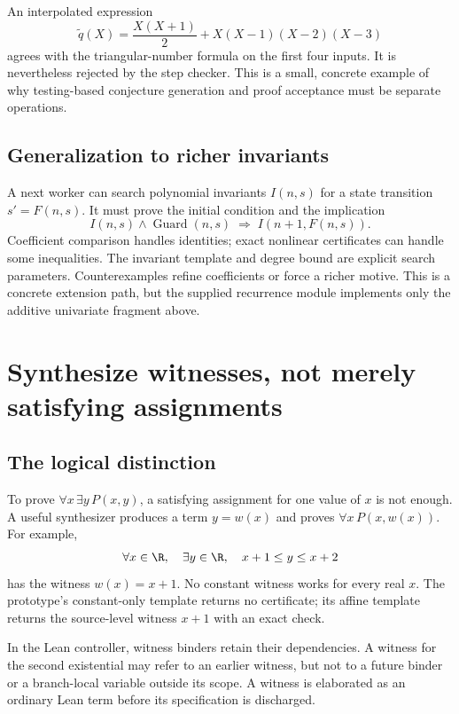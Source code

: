 An interpolated expression
\[
\widetilde q(X)=\frac{X(X+1)}2+X(X-1)(X-2)(X-3)
\]
agrees with the triangular-number formula on the first four inputs. It is
nevertheless rejected by the step checker. This is a small, concrete example
of why testing-based conjecture generation and proof acceptance must be
separate operations.

\subsection{Generalization to richer invariants}

A next worker can search polynomial invariants $I(n,s)$ for a state transition
$s'=F(n,s)$. It must prove the initial condition and the implication
\[
I(n,s)\land \operatorname{Guard}(n,s)
\;\Longrightarrow\; I(n+1,F(n,s)).
\]
Coefficient comparison handles identities; exact nonlinear certificates can
handle some inequalities. The invariant template and degree bound are explicit
search parameters. Counterexamples refine coefficients or force a richer
motive. This is a concrete extension path, but the supplied recurrence module
implements only the additive univariate fragment above.

\section{Synthesize witnesses, not merely satisfying assignments}

\subsection{The logical distinction}

To prove $\forall x\,\exists y\,P(x,y)$, a satisfying assignment for one value
of $x$ is not enough. A useful synthesizer produces a term $y=w(x)$ and proves
$\forall x\,P(x,w(x))$. For example,
\[
\forall x\in\R,\quad \exists y\in\R,\quad x+1\le y\le x+2
\]
has the witness $w(x)=x+1$. No constant witness works for every real $x$.
The prototype's constant-only template returns no certificate; its affine
template returns the source-level witness $x+1$ with an exact check.

In the Lean controller, witness binders retain their dependencies. A witness
for the second existential may refer to an earlier witness, but not to a
future binder or a branch-local variable outside its scope. A witness is
elaborated as an ordinary Lean term before its specification is discharged.

